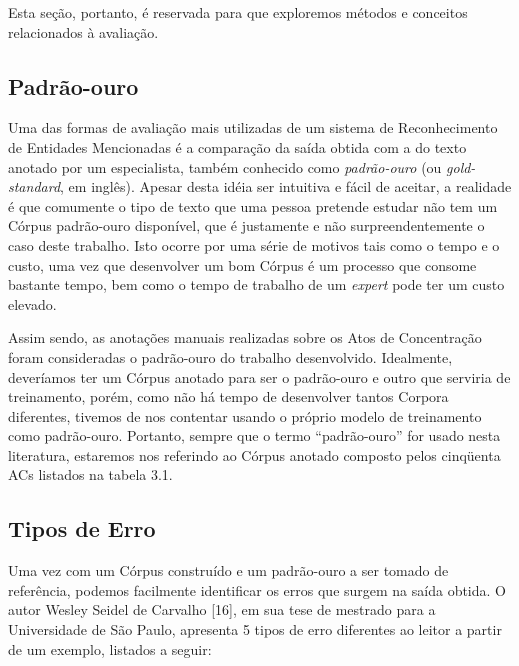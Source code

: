 \documentclass[11pt]{report}
\newcommand{\quotes}[1]{``#1''}
\begin{document}
Esta seção, portanto,
é reservada para que exploremos métodos e conceitos relacionados à avaliação.

\subsection{Padrão-ouro}

\indent\indent Uma das formas de avaliação mais utilizadas de um sistema de Reconhecimento de Entidades Mencionadas é a comparação da saída obtida com a do texto anotado por
um especialista, também conhecido como \textit{padrão-ouro} (ou \textit{gold-standard}, em inglês). Apesar desta idéia ser intuitiva e fácil de aceitar, a realidade é que
comumente o tipo de texto que uma pessoa pretende estudar não tem um Córpus padrão-ouro disponível, que é justamente e não surpreendentemente o caso deste trabalho. Isto ocorre
por uma série de motivos tais como o tempo e o custo, uma vez que desenvolver um bom Córpus é um processo que consome bastante tempo, bem como o tempo de trabalho de um \textit{expert}
pode ter um custo elevado.

Assim sendo, as anotações manuais realizadas sobre os Atos de Concentração foram consideradas o padrão-ouro do trabalho desenvolvido. Idealmente,
deveríamos ter um Córpus anotado para ser o padrão-ouro e outro que serviria de treinamento, porém, como não há tempo de desenvolver tantos Corpora diferentes, tivemos de nos
contentar usando o próprio modelo de treinamento como padrão-ouro. Portanto, sempre que o termo \quotes{padrão-ouro} for usado nesta literatura, estaremos nos referindo ao Córpus
anotado composto pelos cinqüenta ACs listados na tabela 3.1.

\subsection{Tipos de Erro}

\indent\indent Uma vez com um Córpus construído e um padrão-ouro a ser tomado de referência, podemos facilmente identificar os erros que surgem na saída obtida. O autor
Wesley Seidel de Carvalho [16], em sua tese de mestrado para a Universidade de São Paulo, apresenta 5 tipos de erro diferentes ao leitor a partir de um exemplo, listados a seguir:
\end{document}
